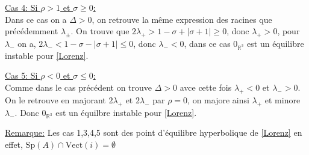 \documentclass{article}
\newcommand{\R}{\mathbb{R}}
\begin{document}
\underline{Cas 4: Si $\rho > 1$ et $\sigma \ge 0 $: }\\
Dans ce cas on a $\Delta > 0$, on retrouve la même expression des racines que précédemment $\lambda_\pm$. On trouve que $2\lambda_+ > 1-\sigma+|\sigma+1| \ge 0$, donc $\lambda_+ > 0$, pour $\lambda_-$ on a, $2\lambda_- < 1-\sigma-|\sigma+1| \le 0 $, donc $\lambda_- < 0$, dans ce cas $0_{\R^3}$ est un équilibre instable pour \eqref{Lorenz}.

\underline{Cas 5: Si $\rho<0$ et $\sigma\le 0$:}\\
Comme dans le cas précédent on trouve $\Delta>0$ avce cette fois $\lambda_+ < 0$ et $\lambda_- >0$. On le retrouve en majorant $2\lambda_+$ et $2\lambda_-$ par $\rho=0$, on majore ainsi $\lambda_+$ et minore $\lambda
_-$. Donc $0_{\R^3}$ est un équilbre instable pour \eqref{Lorenz}.


\underline{Remarque:} Les cas 1,3,4,5 sont des point d'équilibre hyperbolique de \eqref{Lorenz} en effet, $\mathrm{Sp}(A)\cap \mathrm{Vect}(i)= \emptyset$
\end{document}
